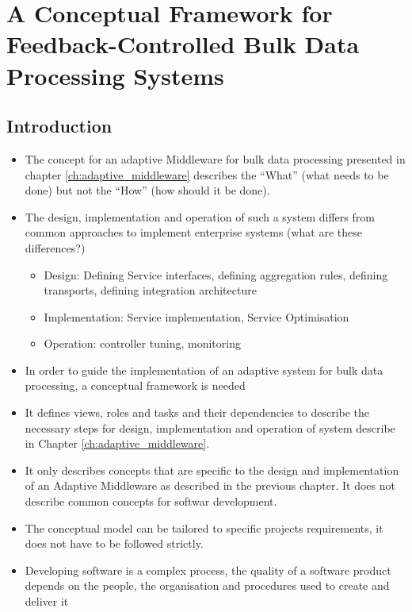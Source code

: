 

\chapter[Conceptual Framework]{A Conceptual Framework for Feedback-Controlled Bulk Data Processing Systems}\label{ch:conceptual_framework}

\section{Introduction} 

\begin{itemize}
	\item The concept for an adaptive Middleware for bulk data processing presented in chapter \ref{ch:adaptive_middleware} describes the ``What'' (what needs to be done) but not the ``How'' (how should it be done).
	\item The design, implementation and operation of such a system differs from common approaches to implement enterprise systems (what are these differences?)
	\begin{itemize}
		\item Design: Defining Service interfaces, defining aggregation rules, defining transports, defining integration architecture
		\item Implementation: Service implementation, Service Optimisation
		\item Operation: controller tuning, monitoring
	\end{itemize}
	\item In order to guide the implementation of an adaptive system for bulk data processing, a conceptual framework is needed
	\item It defines views, roles and tasks and their dependencies to describe the necessary steps for design, implementation and operation of system describe in Chapter \ref{ch:adaptive_middleware}.
	\item It only describes concepts that are specific to the design and implementation of an Adaptive Middleware as described in the previous chapter. It does not describe common concepts for softwar development.
	\item The conceptual model can be tailored to specific projects requirements, it does not have to be followed strictly.
	\item Developing software is a complex process, the quality of a software product depends on the people, the organisation and procedures used to create and deliver it \citep{Fuggetta:2000ds}
\end{itemize}

